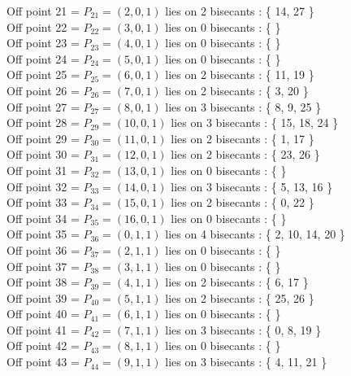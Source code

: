 \documentclass{article}
\begin{document}
{Off point 21 = $P_{21} = ( 2, 0, 1 )$ lies on 2 bisecants : \{ 14, 27 \}\\
Off point 22 = $P_{22} = ( 3, 0, 1 )$ lies on 0 bisecants : \{  \}\\
Off point 23 = $P_{23} = ( 4, 0, 1 )$ lies on 0 bisecants : \{  \}\\
Off point 24 = $P_{24} = ( 5, 0, 1 )$ lies on 0 bisecants : \{  \}\\
Off point 25 = $P_{25} = ( 6, 0, 1 )$ lies on 2 bisecants : \{ 11, 19 \}\\
Off point 26 = $P_{26} = ( 7, 0, 1 )$ lies on 2 bisecants : \{ 3, 20 \}\\
Off point 27 = $P_{27} = ( 8, 0, 1 )$ lies on 3 bisecants : \{ 8, 9, 25 \}\\
Off point 28 = $P_{29} = ( 10, 0, 1 )$ lies on 3 bisecants : \{ 15, 18, 24 \}\\
Off point 29 = $P_{30} = ( 11, 0, 1 )$ lies on 2 bisecants : \{ 1, 17 \}\\
Off point 30 = $P_{31} = ( 12, 0, 1 )$ lies on 2 bisecants : \{ 23, 26 \}\\
Off point 31 = $P_{32} = ( 13, 0, 1 )$ lies on 0 bisecants : \{  \}\\
Off point 32 = $P_{33} = ( 14, 0, 1 )$ lies on 3 bisecants : \{ 5, 13, 16 \}\\
Off point 33 = $P_{34} = ( 15, 0, 1 )$ lies on 2 bisecants : \{ 0, 22 \}\\
Off point 34 = $P_{35} = ( 16, 0, 1 )$ lies on 0 bisecants : \{  \}\\
Off point 35 = $P_{36} = ( 0, 1, 1 )$ lies on 4 bisecants : \{ 2, 10, 14, 20 \}\\
Off point 36 = $P_{37} = ( 2, 1, 1 )$ lies on 0 bisecants : \{  \}\\
Off point 37 = $P_{38} = ( 3, 1, 1 )$ lies on 0 bisecants : \{  \}\\
Off point 38 = $P_{39} = ( 4, 1, 1 )$ lies on 2 bisecants : \{ 6, 17 \}\\
Off point 39 = $P_{40} = ( 5, 1, 1 )$ lies on 2 bisecants : \{ 25, 26 \}\\
Off point 40 = $P_{41} = ( 6, 1, 1 )$ lies on 0 bisecants : \{  \}\\
Off point 41 = $P_{42} = ( 7, 1, 1 )$ lies on 3 bisecants : \{ 0, 8, 19 \}\\
Off point 42 = $P_{43} = ( 8, 1, 1 )$ lies on 0 bisecants : \{  \}\\
Off point 43 = $P_{44} = ( 9, 1, 1 )$ lies on 3 bisecants : \{ 4, 11, 21 \}\\
}
\end{document}
